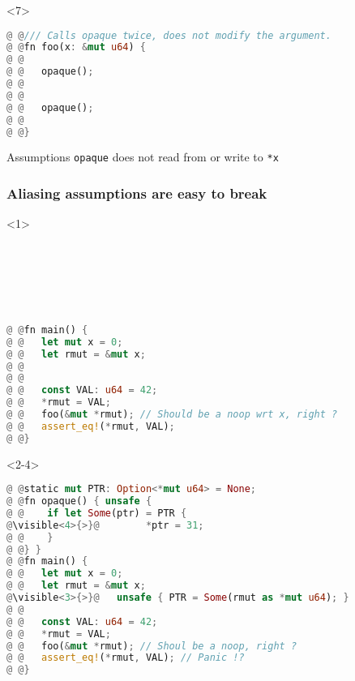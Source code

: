 \begin{frame}[fragile,t]
    \begin{onlyenv}<7>
        \begin{block}{}
            \begin{minipage}{\textwidth}
                \begin{lstlisting}[language=rust, escapechar=@]
@ @/// Calls opaque twice, does not modify the argument.
@ @fn foo(x: &mut u64) {
@ @
@ @   opaque();
@ @
@ @
@ @   opaque();
@ @
@ @}
                \end{lstlisting}
            \end{minipage}
        \end{block}
        \begin{block}{Assumptions}
            \texttt{opaque} does not read from or write to \texttt{*x}
        \end{block}
    \end{onlyenv}

\end{frame}

\begin{frame}[fragile]
    \frametitle{Aliasing assumptions are easy to break}
    \begin{onlyenv}<1>
        \begin{block}{}
            \begin{lstlisting}[language=rust, escapechar=@]






@ @fn main() {
@ @   let mut x = 0;
@ @   let rmut = &mut x;
@ @
@ @
@ @   const VAL: u64 = 42;
@ @   *rmut = VAL;
@ @   foo(&mut *rmut); // Should be a noop wrt x, right ?
@ @   assert_eq!(*rmut, VAL);
@ @}
            \end{lstlisting}
        \end{block}
    \end{onlyenv}

    \begin{onlyenv}<2-4>
        \begin{block}{}
            \begin{lstlisting}[language=rust, escapechar=@]
@ @static mut PTR: Option<*mut u64> = None;
@ @fn opaque() { unsafe {
@ @    if let Some(ptr) = PTR {
@\visible<4>{>}@        *ptr = 31;
@ @    }
@ @} }
@ @fn main() {
@ @   let mut x = 0;
@ @   let rmut = &mut x;
@\visible<3>{>}@   unsafe { PTR = Some(rmut as *mut u64); }
@ @
@ @   const VAL: u64 = 42;
@ @   *rmut = VAL;
@ @   foo(&mut *rmut); // Shoul be a noop, right ?
@ @   assert_eq!(*rmut, VAL); // Panic !?
@ @}
            \end{lstlisting}
        \end{block}
    \end{onlyenv}
\end{frame}

